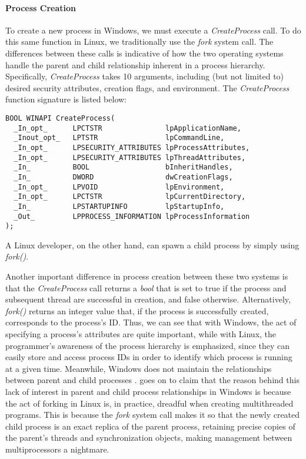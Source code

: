 \documentclass[letterpaper,10pt,titlepage]{article}
\begin{document}
\paragraph{Process Creation} To create a new process in Windows, we must execute a \emph{CreateProcess} call. To do this same function in Linux, we traditionally use the \emph{fork} system call. The differences between these calls is indicative of how the two operating systems handle the parent and child relationship inherent in a process hierarchy. Specifically, \emph{CreateProcess} takes 10 arguments, including (but not limited to) desired security attributes, creation flags, and environment. The \emph{CreateProcess} function signature is listed below:
\begin{lstlisting}
BOOL WINAPI CreateProcess(
  _In_opt_      LPCTSTR               lpApplicationName,
  _Inout_opt_   LPTSTR                lpCommandLine,
  _In_opt_      LPSECURITY_ATTRIBUTES lpProcessAttributes,
  _In_opt_      LPSECURITY_ATTRIBUTES lpThreadAttributes,
  _In_          BOOL                  bInheritHandles,
  _In_          DWORD                 dwCreationFlags,
  _In_opt_      LPVOID                lpEnvironment,
  _In_opt_      LPCTSTR               lpCurrentDirectory,
  _In_          LPSTARTUPINFO         lpStartupInfo,
  _Out_         LPPROCESS_INFORMATION lpProcessInformation
);
\end{lstlisting}
A Linux developer, on the other hand, can spawn a child process by simply using \emph{fork()}. 
\par Another important difference in process creation between these two systems is that the \emph{CreateProcess} call returns a \emph{bool} that is set to true if the process and subsequent thread are successful in creation, and false otherwise. Alternatively, \emph{fork()} returns an integer value that, if the process is successfully created, corresponds to the process's ID. Thus, we can see that with Windows, the act of specifying a process's attributes are quite important, while with Linux, the programmer's awareness of the process hierarchy is emphasized, since they can easily store and access process IDs in order to identify which process is running at a given time. Meanwhile, Windows does not maintain the relationships between parent and child processes \cite{har04}. \cite{har04} goes on to claim that the reason behind this lack of interest in parent and child process relationships in Windows is because the act of forking in Linux is, in practice, dreadful when creating multithreaded programs. This is because the \emph{fork} system call makes it so that the newly created child process is an exact replica of the parent process, retaining precise copies of the parent's threads and synchronization objects, making management between multiprocessors a nightmare. 
\end{document}
